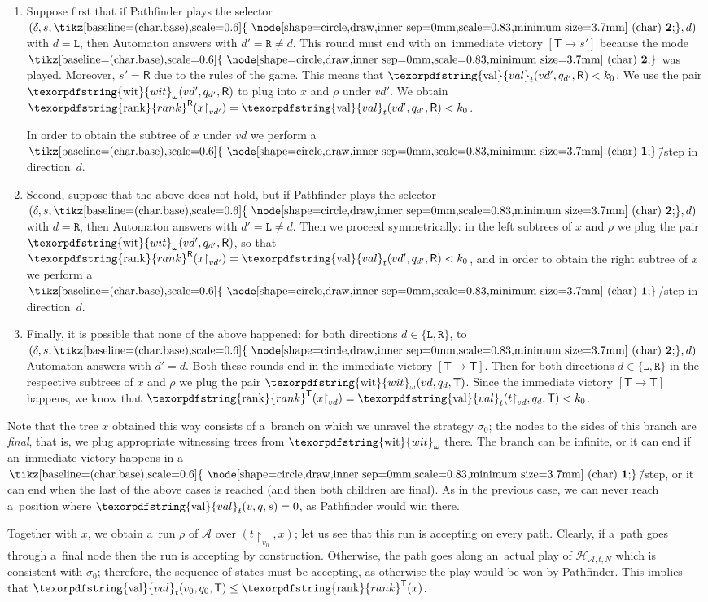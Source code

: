 \documentclass[11pt,a4paper]{amsart}
\theoremstyle{plain}
\theoremstyle{definition}
\theoremstyle{defC}
\theoremstyle{thmC}
\theoremstyle{plain}
\numberwithin{equation}{section}
\numberwithin{equation}{section}
\numberwithin{figure}{section}
\newcommand{\ident}[1]{\ensuremath{\texorpdfstring{\mathrm{\mathnm{#1}}}{#1}}\xspace}
\newcommand{\mathcalsym}[1]{\ensuremath{\mathcal{#1}}\xspace}
\newcommand{\CA}{\mathcalsym{A}}
\newcommand{\CH}{\mathcalsym{H}}
\newcommand{\dL}{\mathtt{{\scriptstyle L}}}
\newcommand{\dR}{\mathtt{{\scriptstyle R}}}
\newcommand{\mathnm}[1]{#1}
\newcommand{\restr}{{\upharpoonright}}
\newcommand{\val}{\ident{val}}
\newcommand{\sT}{\mathsf{T}}
\newcommand{\sR}{\mathsf{R}}
\newcommand{\rankR}{\ident{rank}^\sR}
\newcommand{\rankT}{\ident{rank}^\sT}
\newcommand*\circled[1]{\tikz[baseline=(char.base),scale=0.6]{
            \node[shape=circle,draw,inner sep=0mm,scale=0.83,minimum size=3.7mm] (char) {\textbf{#1}};}}
\newcommand{\fb}{\mathbf{\text{\circled{2}}}}
\newcommand{\fg}{\mathbf{\text{\circled{1}}}}
\newcommand{\imwin}[2]{[#1\to #2]}
\newcommand{\wit}{\ident{wit}_\omega}
\begin{document}
\begin{enumerate}
\item	Suppose first that if Pathfinder plays the selector $(\delta,s,\fb,d)$ with $d=\dL$, then Automaton answers with $d'=\dR\neq d$.
	This round must end with an~immediate victory $\imwin{\sT}{s'}$ because the mode $\fb$ was played.
	Moreover, $s'=\sR$ due to the rules of the game.
	This means that $\val_t(vd',q_{d'},\sR)<k_0$.
	We use the pair $\wit(vd',q_{d'},\sR)$ to plug into $x$ and $\rho$ under $vd'$.
	We obtain $\rankR(x\restr_{vd'})=\val_t(vd',q_{d'},\sR)<k_0$.

	In order to obtain the subtree of $x$ under $vd$ we perform a~$\fg$\=/step in direction~$d$.

\item	Second, suppose that the above does not hold, but if Pathfinder plays the selector $(\delta,s,\fb,d)$ with $d=\dR$, then Automaton answers with $d'=\dL\neq d$.
	Then we proceed symmetrically: in the left subtrees of $x$ and $\rho$ we plug the pair $\wit(vd',q_{d'},\sR)$, so that $\rankR(x\restr_{vd'})=\val_t(vd',q_{d'},\sR)<k_0$,
	and in order to obtain the right subtree of $x$ we perform a~$\fg$\=/step in direction~$d$.

\item	Finally, it is possible that none of the above happened: for both directions $d\in\{\dL,\dR\}$, to $(\delta,s,\fb,d)$ Automaton answers with $d'=d$.
	Both these rounds end in the immediate victory $\imwin{\sT}{\sT}$.
	Then for both directions $d\in\{\dL,\dR\}$ in the respective subtrees of $x$ and $\rho$ we plug the pair $\wit(vd,q_d,\sT)$.
	Since the immediate victory $\imwin{\sT}{\sT}$ happens, we know that $\rankT(x\restr_{vd})=\val_t(t\restr_{vd},q_d,\sT)< k_0$.
\end{enumerate}
\noindent %
Note that the tree $x$ obtained this way consists of a~branch on which we unravel the strategy $\sigma_0$;
the nodes to the sides of this branch are \emph{final}, that is, we plug appropriate witnessing trees from $\wit$ there.
The branch can be infinite, or it can end if an~immediate victory happens in a~$\fg$\=/step, or it can end when the last of the above cases is reached (and then both children are final).
As in the previous case, we can never reach a~position where $\val_t(v,q,s)=0$, as Pathfinder would win there.

Together with $x$, we obtain a~run $\rho$ of $\CA$ over $(t\restr_{v_0},x)$; let us see that this run is accepting on every path.
Clearly, if a~path goes through a~final node then the run is accepting by construction.
Otherwise, the path goes along an~actual play of $\CH_{\CA,t,N}$ which is consistent with $\sigma_0$;
therefore, the sequence of states must be accepting, as otherwise the play would be won by Pathfinder.
This implies that $\val_t(v_0,q_0,\sT)\leq\rankT(x)$.
\end{document}
